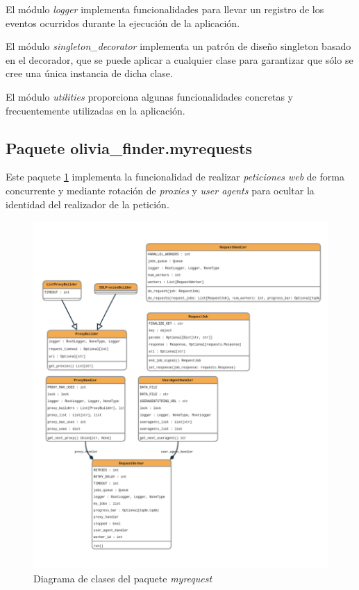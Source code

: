 El módulo \textit{logger} implementa funcionalidades para llevar un registro de los
eventos ocurridos durante la ejecución de la aplicación.

El módulo \textit{singleton\_decorator} implementa un patrón de diseño singleton basado
en el decorador, que se puede aplicar a cualquier clase para garantizar que sólo se cree una
única instancia de dicha clase.

El módulo \textit{utilities} proporciona algunas funcionalidades concretas y frecuentemente
utilizadas en la aplicación.

\subsection{Paquete olivia\_finder.myrequests}

Este paquete \ref{fig:myrequest_classes} implementa la funcionalidad de realizar \textit{peticiones web} de forma concurrente
y mediante rotación de \textit{proxies} y \textit{user agents} para ocultar la identidad del realizador
de la petición.

\begin{figure}[ht!]
    \centering
    \includegraphics[width=1\textwidth]{img/anexos/myrequests_classes.png}
    \caption{Diagrama de clases del paquete \textit{myrequest}}
    \label{fig:myrequest_classes}
\end{figure}



